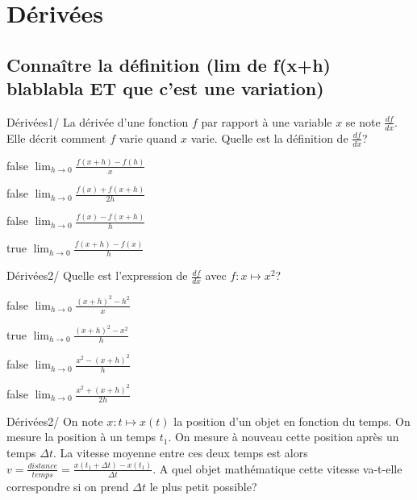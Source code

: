 \documentclass[11pt]{article}
\begin{document}
	\section{Dérivées}
    
    	\subsection{Connaître la définition (lim de f(x+h) blablabla ET que c'est une variation)}
        
        	\begin{question}{19}{Dérivées}{1}{/}
				La dérivée d'une fonction $f$ par rapport à une variable $x$ se note $\frac{df}{dx}$. Elle décrit comment $f$ varie quand $x$ varie. Quelle est la définition de $\frac{df}{dx}$?
            \end{question}

            \begin{reponses}
            	\item[false] $\lim_{h\to 0} \frac{f(x+h)-f(h)}{x}$
            	\item[false] $\lim_{h\to 0} \frac{f(x)+f(x+h)}{2h}$
                \item[false] $\lim_{h\to 0} \frac{f(x)-f(x+h)}{h}$
                \item[true] $\lim_{h\to 0} \frac{f(x+h)-f(x)}{h}$
            \end{reponses}

            \begin{question}{19}{Dérivées}{2}{/}
                Quelle est l'expression de $\frac{df}{dx}$ avec $f:x\mapsto x^2$?
            \end{question}

            \begin{reponses}
                \item[false] $\lim_{h\to 0} \frac{(x+h)^2-h^2}{x}$
                \item[true] $\lim_{h\to 0} \frac{(x+h)^2-x^2}{h}$
                \item[false] $\lim_{h\to 0} \frac{x^2-(x+h)^2}{h}$
                \item[false] $\lim_{h\to 0} \frac{x^2+(x+h)^2}{2h}$
            \end{reponses}

            \begin{question}{19}{Dérivées}{2}{/}
            	On note $x:t\mapsto x(t)$ la position d'un objet en fonction du temps. On mesure la position à un temps $t_1$. On mesure à nouveau cette position après un temps $\Delta t$. La vitesse moyenne entre ces deux temps est alors $v=\frac{distance}{temps}=\frac{x(t_1+\Delta t)-x(t_1)}{\Delta t}$. A quel objet mathématique cette vitesse va-t-elle correspondre si on prend $\Delta t$ le plus petit possible?
            \end{question}
\end{document}
